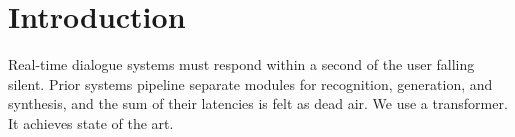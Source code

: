 \section{Introduction}
Real-time dialogue systems must respond within a second of the user
falling silent. Prior systems pipeline separate modules for recognition,
generation, and synthesis, and the sum of their latencies is felt as
dead air. We use a transformer. It achieves state of the art.

